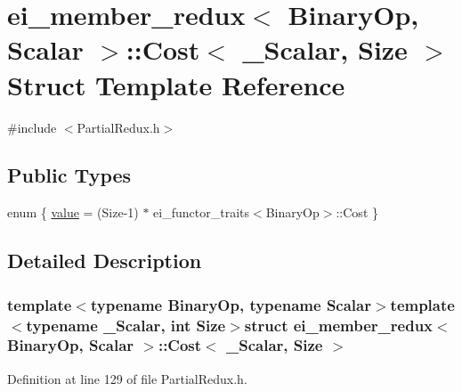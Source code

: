 \hypertarget{structei__member__redux_1_1_cost}{\section{ei\-\_\-member\-\_\-redux$<$ Binary\-Op, Scalar $>$\-:\-:Cost$<$ \-\_\-\-Scalar, Size $>$ Struct Template Reference}
\label{structei__member__redux_1_1_cost}
}


{\ttfamily \#include $<$Partial\-Redux.\-h$>$}

\subsection*{Public Types}
\begin{DoxyCompactItemize}
\item 
enum \{ \hyperlink{structei__member__redux_1_1_cost_a35c0b60f28d877c5cfbd8c3a2aff099ea66714fc1f3603b689f6a436ee97c5845}{value} = (Size-\/1) $\ast$ ei\-\_\-functor\-\_\-traits$<$Binary\-Op$>$\-:\-:Cost
 \}
\end{DoxyCompactItemize}


\subsection{Detailed Description}
\subsubsection*{template$<$typename Binary\-Op, typename Scalar$>$template$<$typename \-\_\-\-Scalar, int Size$>$struct ei\-\_\-member\-\_\-redux$<$ Binary\-Op, Scalar $>$\-::\-Cost$<$ \-\_\-\-Scalar, Size $>$}



Definition at line 129 of file Partial\-Redux.\-h.



